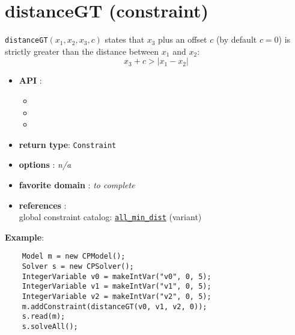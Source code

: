 \label{distancegt}
\hypertarget{distancegt}{}

\section{distanceGT (constraint)}\label{distancegt:distancegtconstraint}\hypertarget{distancegt:distancegtconstraint}{}
\begin{notedef}
  \texttt{distanceGT}$(x_1,x_2,x_3,c)$ states that $x_3$ plus an offset $c$ (by default $c=0$) is strictly greater than the distance between $x_1$ and $x_2$:
$$ x_3 + c > | x_1 - x_2 |$$
\end{notedef}

\begin{itemize}
	\item \textbf{API} :
	\begin{itemize}
		\item {}
		\item {}
		\item {}
	\end{itemize}
	\item \textbf{return type}: \texttt{Constraint}
	\item \textbf{options} : \emph{n/a}
	\item \textbf{favorite domain} : \emph{to complete}
	\item \textbf{references} :\\
      global constraint catalog: \href{http://www.emn.fr/x-info/sdemasse/gccat/Call_min_dist.html}{\tt all\_min\_dist} (variant)
\end{itemize}

\textbf{Example}:
\begin{lstlisting}
	Model m = new CPModel();
	Solver s = new CPSolver();
	IntegerVariable v0 = makeIntVar("v0", 0, 5);
	IntegerVariable v1 = makeIntVar("v1", 0, 5);
	IntegerVariable v2 = makeIntVar("v2", 0, 5);
	m.addConstraint(distanceGT(v0, v1, v2, 0));
	s.read(m);
	s.solveAll();
\end{lstlisting}
